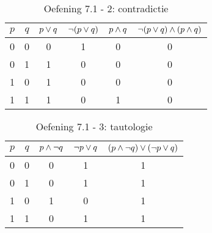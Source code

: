 \begin{oef}
\begin{opl}
\begin{table}[htbp]\footnotesize
\centering
\caption{Oefening 7.1 - 2: contradictie}
\begin{tabular}{cccccc}
\toprule 
$p$ & $q$ & $p\vee q$ & $\neg(p\vee q)$ & $p\wedge q$ & $\neg(p\vee q)\wedge(p\wedge q)$ \\ 
\midrule 
0 & 0 & 0 & 1 & 0 & 0 \\ 
0 & 1 & 1 & 0 & 0 & 0 \\  
1 & 0 & 1 & 0 & 0 & 0 \\  
1 & 1 & 1 & 0 & 1 & 0 \\  
\bottomrule
\end{tabular} 
\label{tab:logica2}
\end{table}

\begin{table}[htbp]\footnotesize
\centering
\caption{Oefening 7.1 - 3: tautologie}
\begin{tabular}{ccccc}
\toprule
$p$ & $q$ & $p\wedge \neg q$ & $\neg p \vee q$ & $(p\wedge \neg q)\vee (\neg p \vee q)$ \\ 
\midrule
0 & 0 & 0 & 1 & 1 \\ 
0 & 1 & 0 & 1 & 1 \\ 
1 & 0 & 1 & 0 & 1 \\  
1 & 1 & 0 & 1 & 1 \\ 
\bottomrule
\end{tabular} 
\label{tab:logica3}
\end{table}
\end{opl}
\end{oef}

